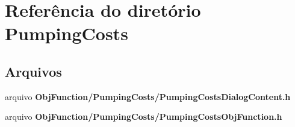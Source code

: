 \section{Referência do diretório Pumping\+Costs}
\label{dir_102b2d0aed07013a2a7e8d57c5714cf5}
\subsection*{Arquivos}
\begin{DoxyCompactItemize}
\item 
arquivo {\bf Obj\+Function/\+Pumping\+Costs/\+Pumping\+Costs\+Dialog\+Content.\+h}
\item 
arquivo {\bf Obj\+Function/\+Pumping\+Costs/\+Pumping\+Costs\+Obj\+Function.\+h}
\end{DoxyCompactItemize}

